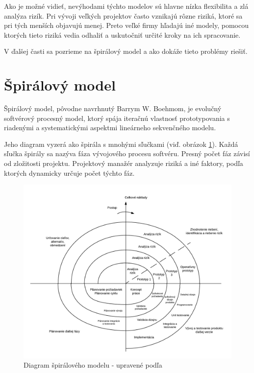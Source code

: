 \documentclass[10pt,twoside,slovak,a4paper]{article}
\begin{document}
Ako je možné vidieť, nevýhodami týchto modelov sú hlavne nízka flexibilita a zlá analýza rizík. Pri vývoji veľkých projektov často vznikajú rôzne riziká, ktoré sa pri tých menších objavujú menej. Preto veľké firmy hľadajú iné modely, pomocou ktorých tieto riziká vedia odhaliť a uskutočniť určité kroky na ich spracovanie.

V ďalšej časti sa pozrieme na špirálový model a ako dokáže tieto problémy riešiť.

\pagebreak

\section{Špirálový model} \label{spiralModel}
Špirálový model, pôvodne navrhnutý Barrym W. Boehmom, je evolučný softvérový procesný model, ktorý spája iteračnú vlastnosť prototypovania s riadenými a systematickými aspektmi lineárneho sekvenčného modelu. \cite{SpiralModelDef}

Jeho diagram vyzerá ako špirála s mnohými sľučkami (viď. obrázok \ref{spiralDiagram}). Každá sľučka špirály sa nazýva fáza vývojového procesu softvéru. Presný počet fáz závisí od zložitosti projektu. Projektový manažér analyzuje riziká a iné faktory, podľa ktorých dynamicky určuje počet týchto fáz.

\begin{figure}[h]
\includegraphics[width=\textwidth]{spiralModel.png}
\caption{Diagram špirálového modelu - upravené podľa \cite{Boehm}} 
\label{spiralDiagram}
\end{figure} 
\end{document}
